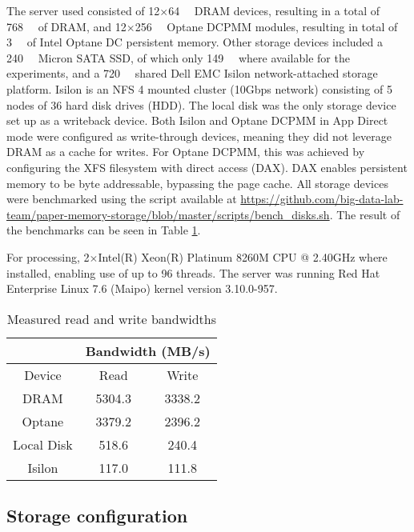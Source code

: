 \documentclass[conference]{IEEEtran}
\begin{document}
The server used consisted of 12$\times$\SI{64}{\gibi\byte} DRAM devices,
resulting in a total of \SI{768}{\gibi\byte} of DRAM, and 12$\times$\SI{256}{\gibi\byte} Optane DCPMM
modules, resulting in total of \SI{3}{\tebi\byte} of Intel Optane DC persistent memory.
Other storage devices included a \SI{240}{\gibi\byte} Micron SATA SSD, of which
only \SI{149}{\gibi\byte} where available for the experiments, and a
\SI{720}{\tebi\byte} shared Dell EMC Isilon network-attached storage platform. Isilon is an NFS 4 mounted
cluster (10Gbps network) consisting of 5 nodes of 36 hard disk drives (HDD). The local disk
was the only storage device set up as a writeback device. Both Isilon and Optane DCPMM in
App Direct mode were configured as write-through devices, meaning they did not leverage
DRAM as a cache for writes. For Optane DCPMM, this was achieved by configuring the XFS filesystem with
direct access (DAX). DAX enables persistent memory to be byte addressable, bypassing the page cache. All storage devices were benchmarked using the script available at \url{https://github.com/big-data-lab-team/paper-memory-storage/blob/master/scripts/bench_disks.sh}.
The result of the benchmarks can be seen in Table \ref{table:bandwidths}.

For processing,
2$\times$Intel(R) Xeon(R) Platinum 8260M CPU @ 2.40GHz where installed, enabling use of up to 96 threads.
The server was running Red Hat Enterprise Linux 7.6 (Maipo) kernel version 3.10.0-957. 


\begin{table}
\begin{center}
 \begin{tabular}{ |c|c|c| } 
     \cline{2-3}
     \multicolumn{1}{c|}{} & \multicolumn{2}{c|}{Bandwidth (MB/s)} \\\hline
  Device & Read & Write \\
 \hline
 DRAM & 5304.3 & 3338.2 \\  
 Optane & 3379.2 & 2396.2 \\   
 Local Disk & 518.6 & 240.4 \\
 Isilon & 117.0 & 111.8 \\
 \hline
\end{tabular}\caption{Measured read and write bandwidths}\label{table:bandwidths}
\end{center}
\end{table}



\subsection{Storage configuration}
\end{document}

